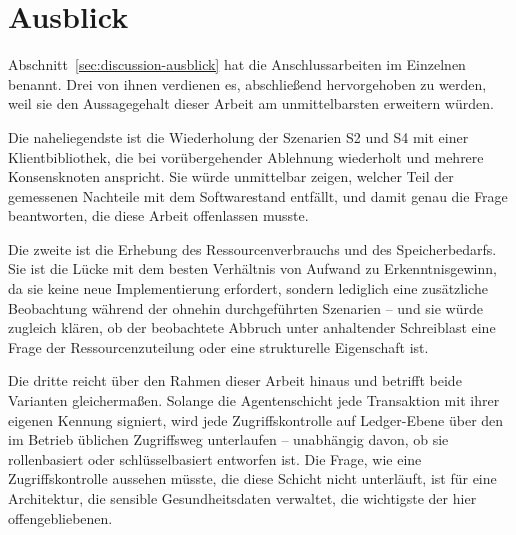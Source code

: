 \section{Ausblick}
\label{sec:conclusion-ausblick}

Abschnitt~\ref{sec:discussion-ausblick} hat die Anschlussarbeiten im Einzelnen benannt. Drei von ihnen verdienen es, abschließend hervorgehoben zu werden, weil sie den Aussagegehalt dieser Arbeit am unmittelbarsten erweitern würden.

Die naheliegendste ist die Wiederholung der Szenarien S2 und S4 mit einer Klientbibliothek, die bei vorübergehender Ablehnung wiederholt und mehrere Konsensknoten anspricht. Sie würde unmittelbar zeigen, welcher Teil der gemessenen Nachteile mit dem Softwarestand entfällt, und damit genau die Frage beantworten, die diese Arbeit offenlassen musste.

Die zweite ist die Erhebung des Ressourcenverbrauchs und des Speicherbedarfs. Sie ist die Lücke mit dem besten Verhältnis von Aufwand zu Erkenntnisgewinn, da sie keine neue Implementierung erfordert, sondern lediglich eine zusätzliche Beobachtung während der ohnehin durchgeführten Szenarien -- und sie würde zugleich klären, ob der beobachtete Abbruch unter anhaltender Schreiblast eine Frage der Ressourcenzuteilung oder eine strukturelle Eigenschaft ist.

Die dritte reicht über den Rahmen dieser Arbeit hinaus und betrifft beide Varianten gleichermaßen. Solange die Agentenschicht jede Transaktion mit ihrer eigenen Kennung signiert, wird jede Zugriffskontrolle auf Ledger-Ebene über den im Betrieb üblichen Zugriffsweg unterlaufen -- unabhängig davon, ob sie rollenbasiert oder schlüsselbasiert entworfen ist. Die Frage, wie eine Zugriffskontrolle aussehen müsste, die diese Schicht nicht unterläuft, ist für eine Architektur, die sensible Gesundheitsdaten verwaltet, die wichtigste der hier offengebliebenen.